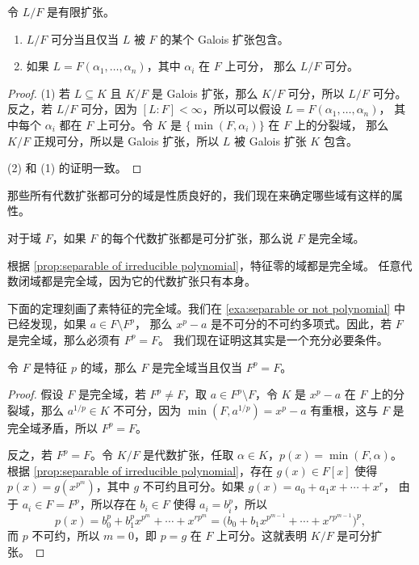 \begin{corollary}
  令 $L/F$ 是有限扩张。
  \begin{enumerate}
    \item $L/F$ 可分当且仅当 $L$ 被 $F$ 的某个 Galois 扩张包含。
    \item 如果 $L=F(\alpha_1,\dots,\alpha_n)$，其中 $\alpha_i$ 在 $F$ 上可分，
    那么 $L/F$ 可分。
  \end{enumerate}
\end{corollary}
\begin{proof}
  (1) 若 $L\subseteq K$ 且 $K/F$ 是 Galois 扩张，那么 $K/F$ 可分，所以 $L/F$ 可分。
  反之，若 $L/F$ 可分，因为 $[L:F]<\infty$，所以可以假设 $L=F(\alpha_1,\dots,\alpha_n)$，
  其中每个 $\alpha_i$ 都在 $F$ 上可分。令 $K$ 是 $\{\min(F,\alpha_i)\}$ 在 $F$ 上的分裂域，
  那么 $K/F$ 正规可分，所以是 Galois 扩张，所以 $L$ 被 Galois 扩张 $K$ 包含。

  (2) 和 (1) 的证明一致。
\end{proof}

那些所有代数扩张都可分的域是性质良好的，我们现在来确定哪些域有这样的属性。

\begin{definition}
  对于域 $F$，如果 $F$ 的每个代数扩张都是可分扩张，那么说 $F$ 是完全域。
\end{definition}

\begin{example}
  根据 \autoref{prop:separable of irreducible polynomial}，特征零的域都是完全域。
  任意代数闭域都是完全域，因为它的代数扩张只有本身。
\end{example}

下面的定理刻画了素特征的完全域。我们在 \autoref{exa:separable or not polynomial} 中已经发现，如果 $a\in F\setminus F^p$，
那么 $x^p-a$ 是不可分的不可约多项式。因此，若 $F$ 是完全域，那么必须有 $F^p=F$。
我们现在证明这其实是一个充分必要条件。

\begin{theorem}
  令 $F$ 是特征 $p$ 的域，那么 $F$ 是完全域当且仅当 $F^p=F$。
\end{theorem}
\begin{proof}
  假设 $F$ 是完全域，若 $F^p\neq F$，取 $a\in F^p\setminus F$，令 $K$
  是 $x^p-a$ 在 $F$ 上的分裂域，那么 $a^{1/p}\in K$ 不可分，因为 $\min(F,a^{1/p})=x^p-a$
  有重根，这与 $F$ 是完全域矛盾，所以 $F^p=F$。

  反之，若 $F^p=F$。令 $K/F$ 是代数扩张，任取 $\alpha\in K$，$p(x)=\min(F,\alpha)$。
  根据 \autoref{prop:separable of irreducible polynomial}，存在 $g(x)\in F[x]$
  使得 $p(x)=g(x^{p^m})$，其中 $g$ 不可约且可分。如果 $g(x)=a_0+a_1x+\cdots+x^r$，
  由于 $a_i\in F=F^p$，所以存在 $b_i\in F$ 使得 $a_i=b_i^p$，所以
  \[
    p(x)=b_0^p+b_1^px^{p^m}+\cdots+x^{rp^{m}}=\bigl(b_0+b_1x^{p^{m-1}}+\cdots+x^{rp^{m-1}}\bigr)^p,
  \]
  而 $p$ 不可约，所以 $m=0$，即 $p=g$ 在 $F$ 上可分。这就表明 $K/F$ 是可分扩张。
\end{proof}

